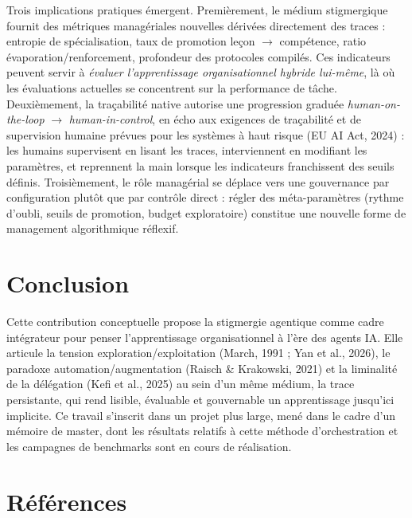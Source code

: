 \documentclass[12pt,a4paper]{article}
\begin{document}
Trois implications pratiques émergent. Premièrement, le médium stigmergique fournit des métriques managériales nouvelles dérivées directement des traces : entropie de spécialisation, taux de promotion leçon $\rightarrow$ compétence, ratio évaporation/renforcement, profondeur des protocoles compilés. Ces indicateurs peuvent servir à \textit{évaluer l'apprentissage organisationnel hybride lui-même}, là où les évaluations actuelles se concentrent sur la performance de tâche. Deuxièmement, la traçabilité native autorise une progression graduée \textit{human-on-the-loop} $\rightarrow$ \textit{human-in-control}, en écho aux exigences de traçabilité et de supervision humaine prévues pour les systèmes à haut risque (EU AI Act, 2024) : les humains supervisent en lisant les traces, interviennent en modifiant les paramètres, et reprennent la main lorsque les indicateurs franchissent des seuils définis. Troisièmement, le rôle managérial se déplace vers une gouvernance par configuration plutôt que par contrôle direct : régler des méta-paramètres (rythme d'oubli, seuils de promotion, budget exploratoire) constitue une nouvelle forme de management algorithmique réflexif.

\section{Conclusion}

Cette contribution conceptuelle propose la stigmergie agentique comme cadre intégrateur pour penser l'apprentissage organisationnel à l'ère des agents IA. Elle articule la tension exploration/exploitation (March, 1991 ; Yan et al., 2026), le paradoxe automation/augmentation (Raisch \& Krakowski, 2021) et la liminalité de la délégation (Kefi et al., 2025) au sein d'un même médium, la trace persistante, qui rend lisible, évaluable et gouvernable un apprentissage jusqu'ici implicite. Ce travail s'inscrit dans un projet plus large, mené dans le cadre d'un mémoire de master, dont les résultats relatifs à cette méthode d'orchestration et les campagnes de benchmarks sont en cours de réalisation.

\hrulefill

\section*{Références}
\end{document}
